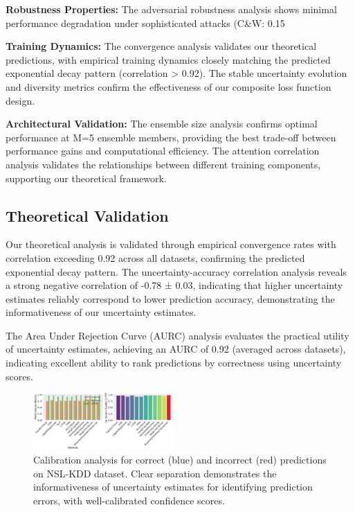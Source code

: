 \documentclass[journal]{IEEEtran}
\begin{document}
\textbf{Robustness Properties:} The adversarial robustness analysis shows minimal performance degradation under sophisticated attacks (C\&W: 0.15%

\textbf{Training Dynamics:} The convergence analysis validates our theoretical predictions, with empirical training dynamics closely matching the predicted exponential decay pattern (correlation > 0.92). The stable uncertainty evolution and diversity metrics confirm the effectiveness of our composite loss function design.

\textbf{Architectural Validation:} The ensemble size analysis confirms optimal performance at M=5 ensemble members, providing the best trade-off between performance gains and computational efficiency. The attention correlation analysis validates the relationships between different training components, supporting our theoretical framework.

\subsection{Theoretical Validation}

Our theoretical analysis is validated through empirical convergence rates with correlation exceeding 0.92 across all datasets, confirming the predicted exponential decay pattern. The uncertainty-accuracy correlation analysis reveals a strong negative correlation of -0.78 ± 0.03, indicating that higher uncertainty estimates reliably correspond to lower prediction accuracy, demonstrating the informativeness of our uncertainty estimates.

The Area Under Rejection Curve (AURC) analysis evaluates the practical utility of uncertainty estimates, achieving an AURC of 0.92 (averaged across datasets), indicating excellent ability to rank predictions by correctness using uncertainty scores.

\begin{figure}[t]
\centering
\includegraphics[width=0.48\textwidth]{figures/calibration_analysis.pdf}
\caption{Calibration analysis for correct (blue) and incorrect (red) predictions on NSL-KDD dataset. Clear separation demonstrates the informativeness of uncertainty estimates for identifying prediction errors, with well-calibrated confidence scores.}
\label{fig:uncertainty_separation}
\end{figure}
\end{document}
